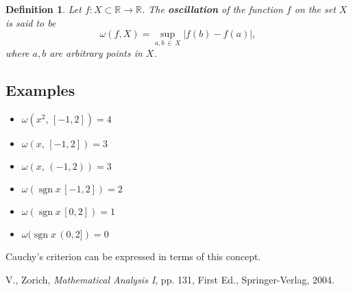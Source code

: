 \documentclass[12pt]{article}
\newtheorem{defn*}{Definition}
\DeclareMathOperator{\sgn}{sgn}
\begin{document}
\begin{defn*}
Let $f:X\subset\mathbb{R}\to\mathbb{R}$. The {\bf oscillation} of the function $f$ on the set $X$ is said to be
$$\omega(f,X)=\sup_{a,b\,\in\, X}|f(b)-f(a)|,$$
where $a, b$ are arbitrary points in $X$.
\end{defn*}

\subsection{Examples}
\begin{itemize}
\item $\omega(x^2, \, [-1,2])=4$
\item $\omega(x, \, [-1,2])=3$
\item $\omega(x, \, (-1,2))=3$
\item $\omega(\sgn x \, [-1,2])=2$
\item $\omega(\sgn x \, [0,2])=1$
\item $\omega(\sgn x \, (0,2])=0$
\end{itemize}
Cauchy's criterion can be expressed in terms of this concept.\cite{cite:Zorich}

\begin{thebibliography}{99}
V., Zorich, {\em Mathematical Analysis I}, pp. 131, First Ed., Springer-Verlag, 2004. 
\end{thebibliography}

\end{document}
